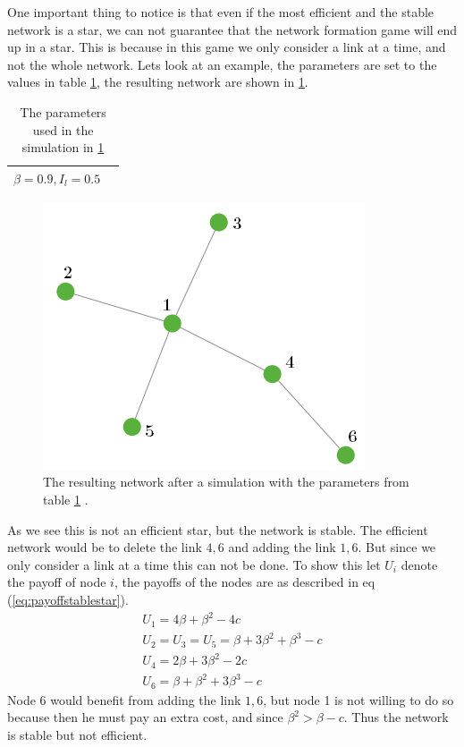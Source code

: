 One important thing to notice is that even if the most efficient and the stable network is a star, we can not guarantee that the network formation game will end up in a star. This is because in this game we only consider a link at a time, and not the whole network.
Lets look at an example, the parameters are set to the values in table \ref{tbl:stablestar}, the resulting network are shown in \ref{fig:stablestar}.
\begin{table}[h]
\centering
\begin{tabular}{lc}
 \hline
  $
  \beta=0.9,
  I_{l}=0.5$\\
  \hline
\end{tabular}
\caption{The parameters used in the simulation in \ref{fig:stablestar} \label{tbl:stablestar}}
\end{table}
\begin{figure}[h]
\centering
  \includegraphics[width=0.5\linewidth]{../Figures/stability/Unefficientbutstablestar.png}
  \caption{\label{fig:stablestar} The resulting network after a simulation with the parameters from table \ref{tbl:stablestar} .}
\end{figure}
As we see this is not an efficient star, but the network is stable. The efficient network would be to delete the link $4,6$ and adding the link $1,6$. But since we only consider a link at a time this can not be done. To show this let $U_{i}$ denote the payoff of node $i$, the payoffs of the nodes are as described in eq (\ref{eq:payoffstablestar}).
\begin{eqnarray}
U_{1}=4\beta+\beta^2-4c\\
U_{2}=U_{3}=U_{5}=\beta+3\beta^2+\beta^3-c\\
U_{4}=2\beta+3\beta^2-2c\\
U_{6}=\beta+\beta^2+3\beta^3-c
\label{eq:payoffstablestar}
\end{eqnarray}
Node $6$ would benefit from adding the link $1,6$, but node 1 is not willing to do so because then he must pay an extra cost, and since $\beta^2>\beta-c$. Thus the network is stable but not efficient. 
